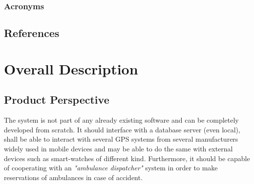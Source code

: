 \documentclass[a4paper]{article}
\begin{document}
            \subsubsection{Acronyms}
            \begin{acronym}
                
            \end{acronym}
            
    \subsection{References}
        \printbibliography[heading=none]
\newpage
\section{Overall Description}
    \subsection{Product Perspective}
    
    The system is not part of any already existing software and can be completely developed from scratch. It should interface with a database server (even local), shall be able to interact with several GPS systems from several manufacturers widely used in mobile devices and may be able to do the same with external devices such as smart-watches of different kind. Furthermore, it should be capable of cooperating with an \textit{"ambulance dispatcher"} system in order to make reservations of ambulances in case of accident.
    
\end{document}
